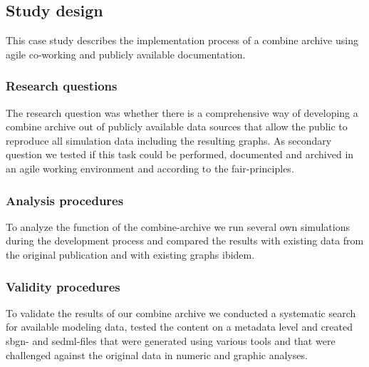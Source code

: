 \subsection*{Study design}
This case study describes the implementation process of a \ac{combine} archive using agile co-working and publicly available documentation.
\subsubsection*{Research questions}
The research question was whether there is a comprehensive way of developing a \ac{combine} archive out of publicly available data sources that allow the public to reproduce all simulation data including the resulting graphs. As secondary question we tested if this task could be performed, documented and archived in an agile working environment and according to the \acs{fair}-principles.
\subsubsection*{Analysis procedures}
To analyze the function of the \ac{combine}-archive we run several own simulations during the development process and compared the results with existing data from the original publication and with existing graphs ibidem.
\subsubsection*{Validity procedures}
To validate the results of our \ac{combine} archive we conducted a systematic search for available modeling data, tested the content on a metadata level and created \ac{sbgn}- and \ac{sedml}-files that were generated using various tools and that were challenged against the original data in numeric and graphic analyses.


